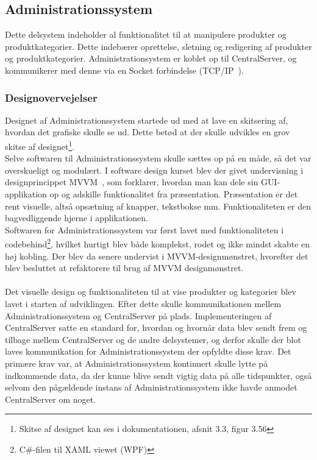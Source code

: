 \subsection{Administrationssystem}
Dette delsystem indeholder al funktionalitet til at manipulere produkter og produktkategorier. Dette indebærer oprettelse, sletning og redigering af produkter og produktkategorier. Administrationsystem er koblet op til CentralServer, og kommunikerer med denne via en Socket forbindelse (TCP/IP~\cite{TCPIP}).

\subsubsection{Designovervejelser}
Designet af Administrationssystem startede ud med at lave en skitsering af, hvordan det grafiske skulle se ud. Dette betød at der skulle udvikles en grov skitse af designet\footnote{Skitse af designet kan ses i dokumentationen, afsnit 3.3, figur 3.56}.\\
Selve softwaren til Administrationssystem skulle sættes op på en måde, så det var overskueligt og modulært. I software design kurset blev der givet undervisning i designprincippet MVVM~\cite{MVVM}, som forklarer, hvordan man kan dele sin GUI-applikation op og adskille funktionalitet fra præsentation. Præsentation er det rent visuelle, altså opsætning af knapper, tekstbokse mm. Funktionaliteten er den bagvedliggende hjerne i applikationen.\\
Softwaren for Administrationssystem var først lavet med funktionaliteten i codebehind\footnote{C\#-filen til XAML viewet (WPF)}, hvilket hurtigt blev både komplekst, rodet og ikke mindst skabte en høj kobling. Der blev da senere undervist i MVVM-designmønstret, hvorefter det blev besluttet at refaktorere til brug af MVVM designmønstret.\\\\

Det visuelle design og funktionaliteten til at vise produkter og kategorier blev lavet i starten af udviklingen. Efter dette skulle kommunikationen mellem Administrationssystem og CentralServer på plads. Implementeringen af CentralServer satte en standard for, hvordan og hvornår data blev sendt frem og tilbage mellem CentralServer og de andre delsystemer, og derfor skulle der blot laves kommunikation for Administrationssystem der opfyldte disse krav. Det primære krav var, at Administrationssystem kontinuert skulle lytte på indkommende data, da der kunne blive sendt vigtig data på alle tidspunkter, også selvom den pågældende instans af Administrationssystem ikke havde anmodet CentralServer om noget.

